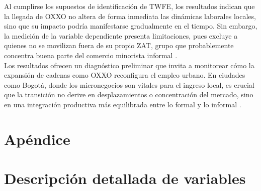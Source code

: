 \documentclass{article}
\begin{document}
Al cumplirse los supuestos de identificación de TWFE, los resultados indican que la llegada de OXXO no altera de forma inmediata las dinámicas laborales locales, sino que su impacto podría manifestarse gradualmente en el tiempo. 
Sin embargo, la medición de la variable dependiente presenta limitaciones, pues excluye a quienes no se movilizan fuera de su propio ZAT, grupo que probablemente concentra buena parte del comercio minorista informal \parencite{DANE2025a}.\\

Los resultados ofrecen un diagnóstico preliminar que invita a monitorear cómo la expansión de cadenas como OXXO reconfigura el empleo urbano. 
En ciudades como Bogotá, donde los micronegocios son vitales para el ingreso local, es crucial que la transición no derive en desplazamientos o concentración del mercado, sino en una integración productiva más equilibrada entre lo formal y lo informal \parencite{DelgadoGomez2025_tiendas_de_barrio}.\\



\newpage
\printbibliography

\newpage

\section{Apéndice}

\appendix
{}

\section{Descripción detallada de variables}
\label{sec:variables_descripcion_detallada}
\end{document}

